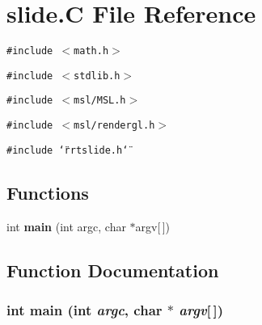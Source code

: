 \section{slide.C File Reference}
\label{slide_8C}
{\tt \#include $<$math.h$>$}\par
{\tt \#include $<$stdlib.h$>$}\par
{\tt \#include $<$msl/MSL.h$>$}\par
{\tt \#include $<$msl/rendergl.h$>$}\par
{\tt \#include \char`\"{}rrtslide.h\char`\"{}}\par
\subsection*{Functions}
\begin{CompactItemize}
\item 
int {\bf main} (int argc, char $\ast$argv[$\,$])
\end{CompactItemize}


\subsection{Function Documentation}
\subsubsection{\setlength{\rightskip}{0pt plus 5cm}int main (int {\em argc}, char $\ast$ {\em argv}[$\,$])}\label{slide_8C_a0}



